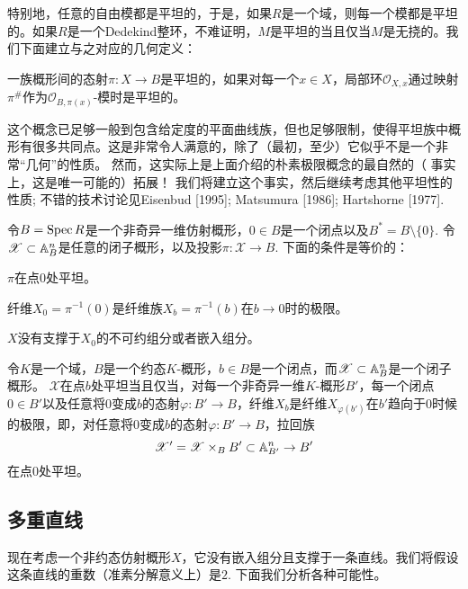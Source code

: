 特别地，任意的自由模都是平坦的，于是，如果$R$是一个域，则每一个模都是平坦的。如果$R$是一个Dedekind整环，不难证明，$M$是平坦的当且仅当$M$是无挠的。我们下面建立与之对应的几何定义：

\begin{defi}
	一族概形间的态射$\pi:X\to B$是平坦的，如果对每一个$x\in X$，局部环$\mathscr{O}_{X,x}$通过映射$\pi^\#$作为$\mathscr{O}_{B,\pi(x)}$-模时是平坦的。
\end{defi}

这个概念已足够一般到包含给定度的平面曲线族，但也足够限制，使得平坦族中概形有很多共同点。这是非常令人满意的，除了（最初，至少）它似乎不是一个非常“几何”的性质。 然而，这实际上是上面介绍的朴素极限概念的最自然的（ 事实上，这是唯一可能的）拓展！ 我们将建立这个事实，然后继续考虑其他平坦性的性质; 不错的技术讨论见Eisenbud [1995]; Matsumura [1986]; Hartshorne [1977]. \nottran

\begin{pro}
	令$B=\operatorname{Spec} R$是一个非奇异一维仿射概形，$0\in B$是一个闭点以及$B^*=B\setminus \{0\}$. 令$\mathscr{X}\subset \mathbb{A}_{B}^n$是任意的闭子概形，以及投影$\pi:\mathscr{X}\to B$. 下面的条件是等价的：
	\begin{compactenum}[\((1)\)]
		\item $\pi$在点$0$处平坦。
		\item 纤维$X_0=\pi^{-1}(0)$是纤维族$X_b=\pi^{-1}(b)$在$b\to 0$时的极限。
		\item $X$没有支撑于$X_0$的不可约组分或者嵌入组分。
	\end{compactenum}
\end{pro}

\begin{lem}
	令$K$是一个域，$B$是一个约态$K$-概形，$b\in B$是一个闭点，而$\mathscr{X}\subset \mathbb{A}_{B}^n$是一个闭子概形。 $\mathscr{X}$在点$b$处平坦当且仅当，对每一个非奇异一维$K$-概形$B'$，每一个闭点$0\in B'$以及任意将$0$变成$b$的态射$\varphi:B'\to B$，纤维$X_b$是纤维$X_{\varphi(b')}$在$b'$趋向于$0$时候的极限，即，对任意将$0$变成$b$的态射$\varphi:B'\to B$，拉回族
	\[
	\mathscr{X}'=\mathscr{X}\times_B B'\subset \mathbb{A}_{B'}^n\to B'
	\]
	在点$0$处平坦。
\end{lem}

\subsection{多重直线}

现在考虑一个非约态仿射概形$X$，它没有嵌入组分且支撑于一条直线。我们将假设这条直线的重数（准素分解意义上）是$2$. 下面我们分析各种可能性。

